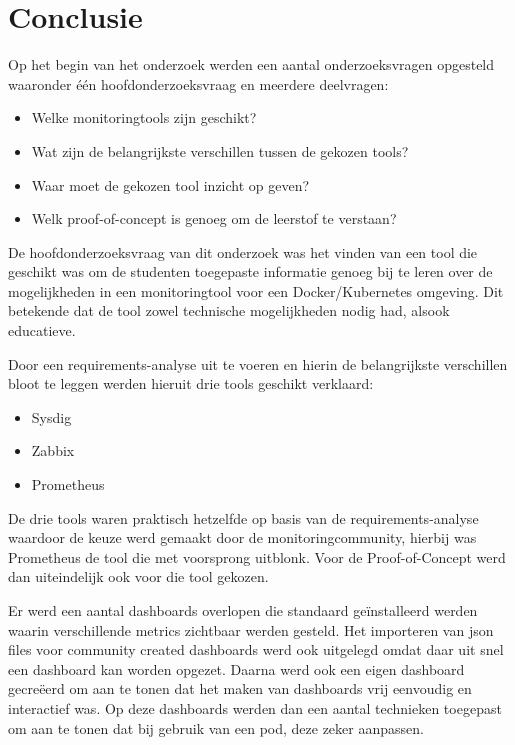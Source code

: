 \chapter{Conclusie}
\label{ch:conclusie}

Op het begin van het onderzoek werden een aantal onderzoeksvragen opgesteld waaronder één hoofdonderzoeksvraag en meerdere deelvragen:

\begin{itemize}
    \item Welke monitoringtools zijn geschikt?
    \item Wat zijn de belangrijkste verschillen tussen de gekozen tools?
    \item Waar moet de gekozen tool inzicht op geven?
    \item Welk proof-of-concept is genoeg om de leerstof te verstaan?
\end{itemize}

De hoofdonderzoeksvraag van dit onderzoek was het vinden van een tool die geschikt was om de studenten toegepaste informatie genoeg bij te leren over de mogelijkheden in een monitoringtool voor een Docker/Kubernetes omgeving. Dit betekende dat de tool zowel technische mogelijkheden nodig had, alsook educatieve.

Door een requirements-analyse uit te voeren en hierin de belangrijkste verschillen bloot te leggen werden hieruit drie tools geschikt verklaard:

\begin{itemize}
    \item Sysdig
    \item Zabbix
    \item Prometheus
\end{itemize}

De drie tools waren praktisch hetzelfde op basis van de requirements-analyse waardoor de keuze werd gemaakt door de monitoringcommunity, hierbij was Prometheus de tool die met voorsprong uitblonk. Voor de Proof-of-Concept werd dan uiteindelijk ook voor die tool gekozen.

Er werd een aantal dashboards overlopen die standaard geïnstalleerd werden waarin verschillende metrics zichtbaar werden gesteld. Het importeren van json files voor community created dashboards werd ook uitgelegd omdat daar uit snel een dashboard kan worden opgezet. Daarna werd ook een eigen dashboard gecreëerd om aan te tonen dat het maken van dashboards vrij eenvoudig en interactief was. Op deze dashboards werden dan een aantal technieken toegepast om aan te tonen dat bij gebruik van een pod, deze zeker aanpassen.  

